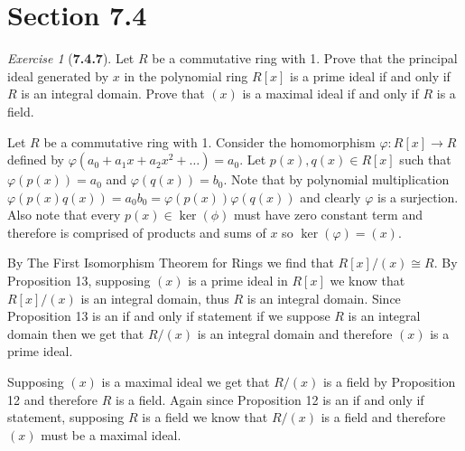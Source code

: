 \documentclass[12pt]{amsart}
\makeatletter
\theoremstyle{remark}
\newtheorem*{exercise}{Exercise}%
\renewenvironment{proof}[1][\proofname]{\par\doublespacing
  \pushQED{\qed}%
  \normalfont \topsep6\p@\@plus6\p@\relax
  \list{}{%
    \settowidth{\leftmargin}{\itshape\proofname:\hskip\labelsep}%
    \setlength{\labelwidth}{0pt}%
    \setlength{\itemindent}{-\leftmargin}%
  }%
  \item[\hskip\labelsep\itshape#1\@addpunct{:}]\ignorespaces
}{%
  \popQED\endlist\@endpefalse
  \singlespacing
}
\theoremstyle{mycomment}
\makeatother
\begin{document}
\thispagestyle{fancy}
\author{Coordinator: Coordinator's Name}







\section*{\textbf{Section 7.4}}

\begin{exercise}[\textbf{7.4.7}] Let $R$ be a commutative ring with 1. Prove that the principal ideal generated by $x$
  in the polynomial ring $R[x]$ is a prime ideal if and only if $R$ is an integral domain. Prove that $(x)$ is a 
  maximal ideal if and only if $R$ is a field. 
  \begin{proof} Let $R$ be a commutative ring with 1. Consider the homomorphism $\varphi: R[x] \to R$ defined by 
    $\varphi(a_0 + a_1x + a_2x^2 + \dots) = a_0$. Let $p(x), q(x) \in R[x]$ such that $\varphi(p(x)) = a_0$ and $\varphi(q(x)) = b_0$.
    Note that by polynomial multiplication $\varphi(p(x)q(x)) = a_0b_0 = \varphi(p(x))\varphi(q(x))$ and clearly $\varphi$ is a surjection.
    Also note that every $p(x) \in \ker(\phi)$ must have zero constant term and therefore is comprised of products and sums of $x$ so $\ker(\varphi) = (x)$.

    By The First Isomorphism Theorem for Rings we find that $R[x]/(x) \cong R$. By Proposition 13, supposing $(x)$ is a prime ideal in $R[x]$ we know that $R[x]/(x)$ is an integral domain, thus $R$ is an integral domain. 
    Since Proposition 13 is an if and only if statement if we suppose $R$ is an integral domain then we get that $R/(x)$ is an integral domain and therefore $(x)$ is a prime ideal. 

    Supposing $(x)$ is a maximal ideal we get that $R/(x)$ is a field by Proposition 12 and therefore $R$ is a field. 
    Again since Proposition 12 is an if and only if statement, supposing $R$ is a field we know that $R/(x)$ is a field and therefore 
    $(x)$ must be a maximal ideal. 

  \end{proof}
\end{exercise}
\vspace{.5in}
\end{document}
